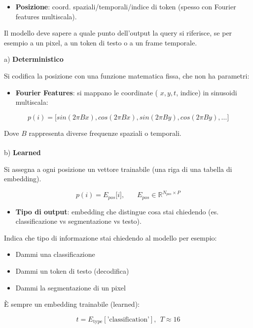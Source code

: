 \documentclass[
  11pt,
]{article}
\begin{document}
\begin{itemize}
\item
  \textbf{Posizione}: coord. spaziali/temporali/indice di token (spesso
  con Fourier features multiscala).
\end{itemize}


Il modello deve sapere a quale punto dell'output la query si riferisce,
se per esempio a un pixel, a un token di testo o a un frame temporale.

a) \textbf{Deterministico}

Si codifica la posizione con una funzione matematica fissa, che non ha
parametri:


\begin{itemize}
\item
  \textbf{Fourier Features}: si mappano le coordinate ( \(x,y,t\),
  indice) in sinusoidi multiscala:
\end{itemize}

\[p(i) = \lbrack sin(2\pi Bx),cos(2\pi Bx),sin(2\pi By),cos(2\pi By),\ldots\rbrack\]

Dove \(B\) rappresenta diverse frequenze spaziali o temporali.\\
\\
b) \textbf{Learned}

Si assegna a ogni posizione un vettore trainabile (una riga di una
tabella di embedding).

\[p(i) = E_{pos}\lbrack i\rbrack,\ \ \ \ \ \ \ \ E_{pos} \in \mathbb{R}^{N_{pos} \times P}\]

\begin{itemize}
\item
  \textbf{Tipo di output}: embedding che distingue cosa stai chiedendo
  (es. classificazione vs segmentazione vs testo).
\end{itemize}


Indica che tipo di informazione stai chiedendo al modello per esempio:


\begin{itemize}
\item Dammi una classificazione
\item Dammi un token di testo (decodifica)
\item Dammi la segmentazione di un pixel
\end{itemize}

È sempre un embedding trainabile (learned):

\[t = E_{\text{type}}\left\lbrack \text{'classification'} \right\rbrack,\ \ T \approx 16\]
\end{document}
